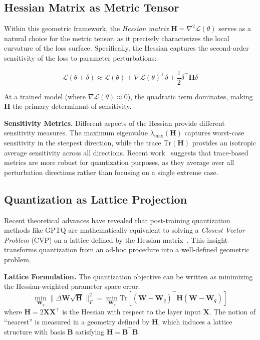 \documentclass[letterpaper,twocolumn,10pt]{article}
\begin{document}
\subsection{Hessian Matrix as Metric Tensor}

Within this geometric framework, the \emph{Hessian matrix} $\mathbf{H} = \nabla^2 \mathcal{L}(\theta)$ serves as a natural choice for the metric tensor, as it precisely characterizes the local curvature of the loss surface. Specifically, the Hessian captures the second-order sensitivity of the loss to parameter perturbations:

\begin{equation}
\mathcal{L}(\theta + \delta) \approx \mathcal{L}(\theta) + \nabla \mathcal{L}(\theta)^\top \delta + \frac{1}{2} \delta^\top \mathbf{H} \delta
\end{equation}

At a trained model (where $\nabla \mathcal{L}(\theta) \approx 0$), the quadratic term dominates, making $\mathbf{H}$ the primary determinant of sensitivity.

\textbf{Sensitivity Metrics.} Different aspects of the Hessian provide different sensitivity measures. The maximum eigenvalue $\lambda_{\max}(\mathbf{H})$ captures worst-case sensitivity in the steepest direction, while the trace $\text{Tr}(\mathbf{H})$ provides an isotropic average sensitivity across all directions. Recent work~\cite{frantar2022gptq} suggests that trace-based metrics are more robust for quantization purposes, as they average over all perturbation directions rather than focusing on a single extreme case.

\subsection{Quantization as Lattice Projection}

Recent theoretical advances have revealed that post-training quantization methods like GPTQ are mathematically equivalent to solving a \emph{Closest Vector Problem} (CVP) on a lattice defined by the Hessian matrix~\cite{frantar2022gptq}. This insight transforms quantization from an ad-hoc procedure into a well-defined geometric problem.

\textbf{Lattice Formulation.} The quantization objective can be written as minimizing the Hessian-weighted parameter space error:
\begin{equation}
\min_{\mathbf{W}_q} \|\Delta \mathbf{W} \sqrt{\mathbf{H}}\|_F^2 = \min_{\mathbf{W}_q} \text{Tr}[(\mathbf{W} - \mathbf{W}_q)^\top \mathbf{H} (\mathbf{W} - \mathbf{W}_q)]
\end{equation}
where $\mathbf{H} = 2\mathbf{X}\mathbf{X}^\top$ is the Hessian with respect to the layer input $\mathbf{X}$. The notion of ``nearest'' is measured in a geometry defined by $\mathbf{H}$, which induces a lattice structure with basis $\mathbf{B}$ satisfying $\mathbf{H} = \mathbf{B}^\top \mathbf{B}$.
\end{document}
